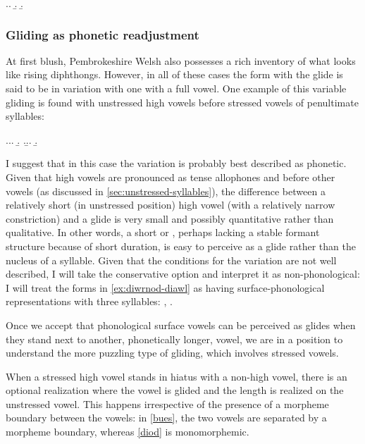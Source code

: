 \ex.\a.
\b.
\b.

\subsubsection{Gliding as phonetic readjustment}
\label{sec:gliding-as-phonetic}

At first blush, Pembrokeshire Welsh also possesses a rich inventory of what looks like rising diphthongs. However, in all of these cases the form with the glide is said to be in variation with one with a full vowel. One example of this variable gliding is found with unstressed high vowels before stressed vowels of penultimate syllables:

\ex.\label{ex:diwrnod-diawl}\a.\a.
\b.
\z.\b.\a.
\b.

I suggest that in this case the variation is probably best described as phonetic. Given that high vowels are pronounced as tense allophones  and  before other vowels (as discussed in \cref{sec:unstressed-syllables}), the difference between a relatively short (in unstressed position) high vowel  (with a relatively narrow constriction) and a glide  is very small and possibly quantitative rather than qualitative. In other words, a short  or , perhaps lacking a stable formant structure because of short duration, is easy to perceive as a glide rather than the nucleus of a syllable. Given that the conditions for the variation are not well described, I will take the conservative option and interpret it as non\hyp phonological: I will treat the forms in \cref{ex:diwrnod-diawl} as having surface\hyp phonological representations with three syllables: , .

Once we accept that phonological surface vowels can be perceived as glides when they stand next to another, phonetically longer, vowel, we are in a position to understand the more puzzling type of gliding, which involves stressed vowels.

When a stressed high vowel stands in hiatus with a non-high vowel, there is an optional realization where the vowel is glided and the length is realized on the unstressed vowel. This happens irrespective of the presence of a morpheme boundary between the vowels: in \cref{bues}, the two vowels are separated by a morpheme boundary, whereas \cref{diod} is monomorphemic.

